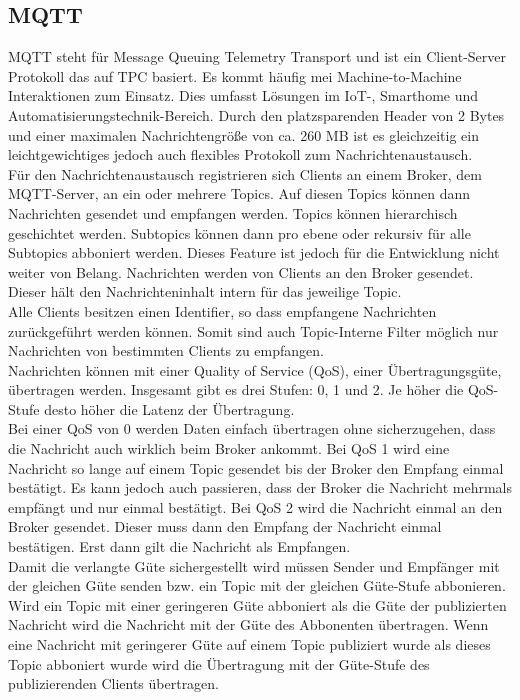 \documentclass[11pt,a4paper]{report}
\begin{document}
\subsection{MQTT}
MQTT steht für Message Queuing Telemetry Transport und ist ein Client-Server Protokoll das auf TPC basiert.
Es kommt häufig mei Machine-to-Machine Interaktionen zum Einsatz.
Dies umfasst Lösungen im IoT-, Smarthome und Automatisierungstechnik-Bereich.
Durch den platzsparenden Header von 2 Bytes und einer maximalen Nachrichtengröße von ca. 260 MB ist es gleichzeitig ein leichtgewichtiges jedoch auch flexibles Protokoll zum Nachrichtenaustausch.
\\
Für den Nachrichtenaustausch registrieren sich Clients an einem Broker, dem MQTT-Server, an ein oder mehrere Topics.
Auf diesen Topics können dann Nachrichten gesendet und empfangen werden.
Topics können hierarchisch geschichtet werden.
Subtopics können dann pro ebene oder rekursiv für alle Subtopics abboniert werden.
Dieses Feature ist jedoch für die Entwicklung nicht weiter von Belang.
Nachrichten werden von Clients an den Broker gesendet.
Dieser hält den Nachrichteninhalt intern für das jeweilige Topic.
\\
Alle Clients besitzen einen Identifier, so dass empfangene Nachrichten zurückgeführt werden können.
Somit sind auch Topic-Interne Filter möglich nur Nachrichten von bestimmten Clients zu empfangen.
\\
Nachrichten können mit einer Quality of Service (QoS), einer Übertragungsgüte, übertragen werden.
Insgesamt gibt es drei Stufen: 0, 1 und 2.
Je höher die QoS-Stufe desto höher die Latenz der Übertragung.
\\
Bei einer QoS von 0 werden Daten einfach übertragen ohne sicherzugehen, dass die Nachricht auch wirklich beim Broker ankommt. 
Bei QoS 1 wird eine Nachricht so lange auf einem Topic gesendet bis der Broker den Empfang einmal bestätigt.
Es kann jedoch auch passieren, dass der Broker die Nachricht mehrmals empfängt und nur einmal bestätigt.
Bei QoS 2 wird die Nachricht einmal an den Broker gesendet.
Dieser muss dann den Empfang der Nachricht einmal bestätigen.
Erst dann gilt die Nachricht als Empfangen.
\\
Damit die verlangte Güte sichergestellt wird müssen Sender und Empfänger mit der gleichen Güte senden bzw. ein Topic mit der gleichen Güte-Stufe abbonieren.
Wird ein Topic mit einer geringeren Güte abboniert als die Güte der publizierten Nachricht wird die Nachricht mit der Güte des Abbonenten übertragen.
Wenn eine Nachricht mit geringerer Güte auf einem Topic publiziert wurde als dieses Topic abboniert wurde wird die Übertragung mit der Güte-Stufe des publizierenden Clients übertragen.
\end{document}
